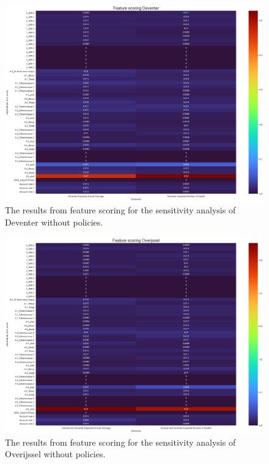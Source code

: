 \begin{figure}[h!]
    \centering
    \includegraphics[width=\textwidth]{report/figures/results/sa_model_Deventer.png}
    \caption{The results from feature scoring for the sensitivity analysis of Deventer without policies.}
    \label{fig:feat-scor-d-wo}
\end{figure}

\begin{figure}[h!]
    \centering
    \includegraphics[width=\textwidth]{report/figures/results/sa_model_Overijssel.png}
    \caption{The results from feature scoring for the sensitivity analysis of Overijssel without policies.}
    \label{fig:feat-scor-o-wo}
\end{figure}

